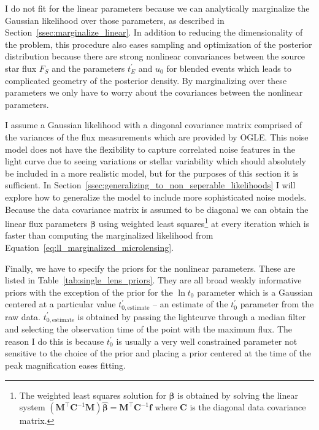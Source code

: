 \documentclass[12pt,dvipsnames]{report}
\renewcommand{\vec}[1]{\boldsymbol{\mathbf{#1}}}
\begin{document}
I do not fit for the linear parameters because we can analytically marginalize 
the Gaussian likelihood over those parameters, as described in 
Section~\ref{ssec:marginalize_linear}. In addition to reducing the dimensionality 
of the problem, this procedure also eases sampling and optimization of the posterior
distribution because there are strong nonlinear convariances between the source star flux 
$F_S$ and the parameters $t_E^\prime$ and $u_0$ for blended events which leads to 
complicated geometry of the posterior density. By marginalizing over these parameters
we only have to worry about the covariances between the nonlinear parameters. 

I assume a Gaussian likelihood with a diagonal covariance matrix comprised of the 
variances of the flux measurements which are provided by OGLE. This noise model 
does not have the flexibility to capture correlated noise features in the light curve 
due to seeing variations or stellar variability which should absolutely be included 
in a more realistic model, but for the purposes of this section it is sufficient.
In Section~\ref{ssec:generalizing_to_non_seperable_likelihoods} I will explore how to 
generalize the model to include more sophisticated noise models.
Because the data covariance matrix is assumed to be diagonal we can obtain the 
linear flux parameters $\vec \beta$ using weighted least squares\footnote{
    The weighted least squares solution for $\vec\beta$ is obtained by 
    solving the linear system $(\vec M^\intercal \vec C^{-1} \vec M)\hat{\vec\beta} = \vec M^\intercal \vec C^{-1} \vec f$ 
    where $\vec C$ is the diagonal data covariance matrix.}
    at every iteration which is faster than computing the marginalized likelihood from 
Equation~\ref{eq:ll_marginalized_microlensing}. 

Finally, we have to specify the priors for the nonlinear parameters. These are listed 
in Table~\ref{tab:single_lens_priors}. They are all broad weakly informative priors
with the exception of the prior for the $\ln t_0$ parameter which is a Gaussian 
centered at a particular value $t^\prime_{0, \mathrm{estimate}}$ -- an estimate of the 
$t_0^\prime$ parameter from the raw data. 
$t^\prime_{0,\mathrm{estimate}}$ is obtained by passing the lightcurve through 
a median filter and selecting the observation time of the point with the maximum flux.
The reason I do this is because $t_0^\prime$ is usually a very well constrained 
parameter not sensitive to the choice of the prior and placing a prior centered 
at the time of the peak magnification eases fitting.
\end{document}
